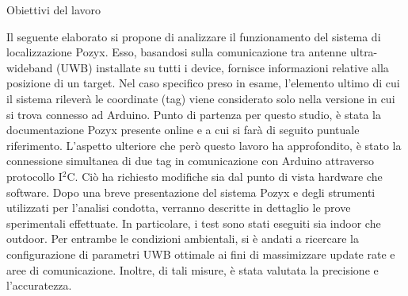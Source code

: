 \documentclass[12pt]{report}
\author{\Large  \textbf{Sabrina Avantaggiato} \\ n\degree matricola: 490654 \\@ \mail{sabrina.avantaggiato@hotmail.it} \and \Large \textbf{Alfredo Bagalà} \\ n\degree matricola: 492473 \\ @ \mail{bagalaalfredo@gmail.com} }
\begin{document}
	\thispagestyle{empty}
	\maketitle 
	
	\thispagestyle{empty}
	\tableofcontents
	\thispagestyle{empty}
	
	\newpage
	
	\begin{section}{Obiettivi del lavoro}
		
		Il seguente elaborato si propone di analizzare il funzionamento del sistema di localizzazione Pozyx. Esso, basandosi sulla comunicazione tra antenne ultra-wideband (UWB) installate su tutti i device, fornisce informazioni relative alla posizione di un target. Nel caso specifico preso in esame, l'elemento ultimo di cui 				il sistema rileverà le coordinate (tag) viene considerato solo nella versione in cui si trova connesso ad Arduino. Punto di partenza per questo studio, è stata la documentazione Pozyx presente online e a cui si farà di seguito puntuale riferimento. L’aspetto ulteriore che però questo lavoro ha approfondito, è stato la 				connessione simultanea di due tag in comunicazione con Arduino attraverso protocollo I$^2$C. Ciò ha richiesto modifiche sia dal punto di vista hardware che software. 
		Dopo una breve presentazione del sistema Pozyx e degli strumenti utilizzati per l’analisi condotta, verranno descritte in dettaglio le prove sperimentali effettuate. In particolare, i test sono stati eseguiti sia indoor che outdoor. Per entrambe le condizioni ambientali, si è andati a ricercare la configurazione di 							parametri UWB ottimale ai fini di massimizzare update rate e aree di comunicazione. Inoltre, di tali misure, è stata valutata la precisione e l’accuratezza.

	\end{section}
	
\end{document}
